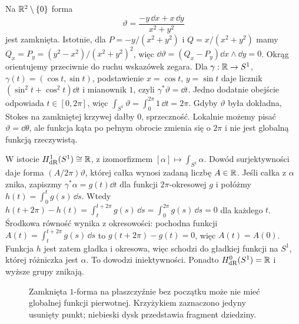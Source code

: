 \begin{przyklad}
\label{prz:de-rham-s1}
Na $\mathbb{R}^2\setminus\{0\}$ forma
\[
 \vartheta=\frac{-y\,\dd x+x\,\dd y}{x^2+y^2}
\]
jest zamknięta. Istotnie, dla
$P=-y/(x^2+y^2)$ i $Q=x/(x^2+y^2)$ mamy
$Q_x=P_y=(y^2-x^2)/(x^2+y^2)^2$, więc
$\dd\vartheta=(Q_x-P_y)\dd x\wedge\dd y=0$.
Okrąg orientujemy przeciwnie do ruchu wskazówek zegara.
Dla $\gamma:\mathbb{R}\to S^1$, $\gamma(t)=(\cos t,\sin t)$,
podstawienie $x=\cos t$, $y=\sin t$ daje licznik
$(\sin^2t+\cos^2t)\dd t$ i mianownik $1$, czyli
$\gamma^*\vartheta=\dd t$.
Jedno dodatnie obejście odpowiada $t\in[0,2\pi]$, więc
$\int_{S^1}\vartheta=\int_0^{2\pi}1\,\dd t=2\pi$. Gdyby $\vartheta$
była dokładna, Stokes na zamkniętej krzywej
dałby $0$, sprzeczność. Lokalnie możemy
pisać $\vartheta=\dd\theta$, ale funkcja kąta
po pełnym obrocie zmienia się o $2\pi$ i nie
jest globalną funkcją rzeczywistą.

W istocie $H^1_{\mathrm{dR}}(S^1)\cong\mathbb{R}$,
z izomorfizmem $[\alpha]\mapsto\int_{S^1}\alpha$.
Dowód surjektywności daje forma
$(A/2\pi)\vartheta$, której całka wynosi zadaną liczbę $A\in\mathbb{R}$.
Jeśli całka z $\alpha$ znika, zapiszmy
$\gamma^*\alpha=g(t)\dd t$ dla funkcji
$2\pi$-okresowej $g$ i połóżmy
$h(t)=\int_0^t g(s)\,\dd s$. Wtedy
$h(t+2\pi)-h(t)=\int_t^{t+2\pi}g(s)\,\dd s
=\int_0^{2\pi}g(s)\,\dd s=0$ dla każdego $t$.
Środkowa równość wynika z okresowości:
pochodna funkcji $A(t)=\int_t^{t+2\pi}g(s)\,\dd s$
to $g(t+2\pi)-g(t)=0$, więc $A(t)=A(0)$.
Funkcja $h$ jest zatem gładka i okresowa, więc schodzi
do gładkiej funkcji na $S^1$, której różniczka jest $\alpha$.
To dowodzi iniektywności. Ponadto
$H^0_{\mathrm{dR}}(S^1)=\mathbb{R}$ i wyższe grupy znikają.
\end{przyklad}

\begin{figure}[!htbp]
\centering
{}
\caption{Zamknięta $1$-forma na płaszczyźnie bez początku
może nie mieć globalnej funkcji pierwotnej.
Krzyżykiem zaznaczono jedyny usunięty punkt; niebieski
dysk przedstawia fragment dziedziny.}
\label{fig:de-rham-kat}
\end{figure}

